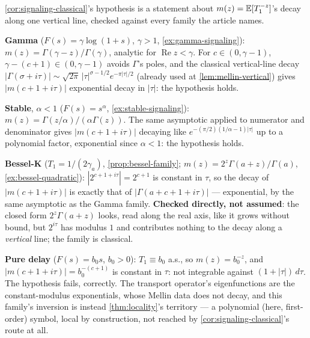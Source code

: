 \begin{remark}\label{rem:classical-families}
\ref{cor:signaling-classical}'s hypothesis is a statement about $m(z) = \mathbb{E}[T_1^{-z}]$'s decay
along one vertical line, checked against every family the article names.

\textbf{Gamma} ($F(s) = \gamma\log(1+s)$, $\gamma>1$, \ref{ex:gamma-signaling}):
$m(z) = \Gamma(\gamma-z)/\Gamma(\gamma)$, analytic for $\operatorname{Re} z < \gamma$. For $c \in (0,\gamma-1)$,
$\gamma - (c+1) \in (0,\gamma-1)$ avoids $\Gamma$'s poles, and the classical vertical-line decay
$|\Gamma(\sigma+i\tau)| \sim \sqrt{2\pi}\,|\tau|^{\sigma-1/2}e^{-\pi|\tau|/2}$ (already used at
\ref{lem:mellin-vertical}) gives $|m(c+1+i\tau)|$ exponential decay in $|\tau|$: the hypothesis
holds.

\textbf{Stable}, $\alpha<1$ ($F(s)=s^\alpha$, \ref{ex:stable-signaling}):
$m(z) = \Gamma(z/\alpha)/(\alpha\Gamma(z))$. The same asymptotic applied to numerator and
denominator gives $|m(c+1+i\tau)|$ decaying like $e^{-(\pi/2)(1/\alpha-1)|\tau|}$ up to a
polynomial factor, exponential since $\alpha<1$: the hypothesis holds.

\textbf{Bessel-K} ($T_1 = 1/(2\gamma_a)$, \ref{prop:bessel-family}; $m(z) = 2^z\Gamma(a+z)/\Gamma(a)$,
\ref{ex:bessel-quadratic}): $|2^{c+1+i\tau}| = 2^{c+1}$ is constant in $\tau$, so the decay of
$|m(c+1+i\tau)|$ is exactly that of $|\Gamma(a+c+1+i\tau)|$ --- exponential, by the same asymptotic
as the Gamma family. \textbf{Checked directly, not assumed}: the closed form $2^z\Gamma(a+z)$ looks,
read along the real axis, like it grows without bound, but $2^{i\tau}$ has modulus $1$ and
contributes nothing to the decay along a \emph{vertical} line; the family is classical.

\textbf{Pure delay} ($F(s)=b_0s$, $b_0>0$): $T_1 \equiv b_0$ a.s., so $m(z) = b_0^{-z}$, and
$|m(c+1+i\tau)| = b_0^{-(c+1)}$ is constant in $\tau$: not integrable against $(1+|\tau|)\,d\tau$.
The hypothesis fails, correctly. The transport operator's eigenfunctions are the constant-modulus
exponentials, whose Mellin data does not decay, and this family's inversion is instead
\ref{thm:locality}'s territory --- a polynomial (here, first-order) symbol, local by construction,
not reached by \ref{cor:signaling-classical}'s route at all.
\end{remark}

